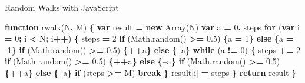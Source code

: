 \documentclass[ignorenonframetext,]{beamer}
\newenvironment{Shaded}{\begin{snugshade}}{\end{snugshade}}
\newcommand{\AttributeTok}[1]{\textcolor[rgb]{0.77,0.63,0.00}{#1}}
\newcommand{\ControlFlowTok}[1]{\textcolor[rgb]{0.13,0.29,0.53}{\textbf{#1}}}
\newcommand{\DecValTok}[1]{\textcolor[rgb]{0.00,0.00,0.81}{#1}}
\newcommand{\FloatTok}[1]{\textcolor[rgb]{0.00,0.00,0.81}{#1}}
\newcommand{\KeywordTok}[1]{\textcolor[rgb]{0.13,0.29,0.53}{\textbf{#1}}}
\newcommand{\NormalTok}[1]{#1}
\newcommand{\OperatorTok}[1]{\textcolor[rgb]{0.81,0.36,0.00}{\textbf{#1}}}
\newcommand{\VariableTok}[1]{\textcolor[rgb]{0.00,0.00,0.00}{#1}}
\begin{document}
\begin{frame}[fragile]{Random Walks with JavaScript}
\protect\hypertarget{random-walks-with-javascript}{}

\begin{Shaded}
\begin{Highlighting}[]
\KeywordTok{function} \AttributeTok{rwalk}\NormalTok{(N}\OperatorTok{,}\NormalTok{ M) }\OperatorTok{\{}
    \KeywordTok{var}\NormalTok{ result }\OperatorTok{=} \KeywordTok{new} \AttributeTok{Array}\NormalTok{(N)}
    \KeywordTok{var}\NormalTok{ a }\OperatorTok{=} \DecValTok{0}\OperatorTok{,}\NormalTok{ steps}
    \ControlFlowTok{for}\NormalTok{ (}\KeywordTok{var}\NormalTok{ i }\OperatorTok{=} \DecValTok{0}\OperatorTok{;}\NormalTok{ i }\OperatorTok{<}\NormalTok{ N}\OperatorTok{;}\NormalTok{ i}\OperatorTok{++}\NormalTok{) }\OperatorTok{\{}
\NormalTok{        steps }\OperatorTok{=} \DecValTok{2}
        \ControlFlowTok{if}\NormalTok{ (}\VariableTok{Math}\NormalTok{.}\AttributeTok{random}\NormalTok{() }\OperatorTok{>=} \FloatTok{0.5}\NormalTok{) }\OperatorTok{\{}\NormalTok{a }\OperatorTok{=} \DecValTok{1}\OperatorTok{\}} \ControlFlowTok{else} \OperatorTok{\{}\NormalTok{a }\OperatorTok{=} \DecValTok{-1}\OperatorTok{\}}
        \ControlFlowTok{if}\NormalTok{ (}\VariableTok{Math}\NormalTok{.}\AttributeTok{random}\NormalTok{() }\OperatorTok{>=} \FloatTok{0.5}\NormalTok{) }\OperatorTok{\{++}\NormalTok{a}\OperatorTok{\}} \ControlFlowTok{else} \OperatorTok{\{--}\NormalTok{a}\OperatorTok{\}}
        \ControlFlowTok{while}\NormalTok{ (a }\OperatorTok{!=} \DecValTok{0}\NormalTok{) }\OperatorTok{\{}
\NormalTok{            steps }\OperatorTok{+=} \DecValTok{2}
            \ControlFlowTok{if}\NormalTok{ (}\VariableTok{Math}\NormalTok{.}\AttributeTok{random}\NormalTok{() }\OperatorTok{>=} \FloatTok{0.5}\NormalTok{) }\OperatorTok{\{++}\NormalTok{a}\OperatorTok{\}} \ControlFlowTok{else} \OperatorTok{\{--}\NormalTok{a}\OperatorTok{\}}
            \ControlFlowTok{if}\NormalTok{ (}\VariableTok{Math}\NormalTok{.}\AttributeTok{random}\NormalTok{() }\OperatorTok{>=} \FloatTok{0.5}\NormalTok{) }\OperatorTok{\{++}\NormalTok{a}\OperatorTok{\}} \ControlFlowTok{else} \OperatorTok{\{--}\NormalTok{a}\OperatorTok{\}}
            \ControlFlowTok{if}\NormalTok{ (steps }\OperatorTok{>=}\NormalTok{ M) }\ControlFlowTok{break}
        \OperatorTok{\}}
\NormalTok{        result[i] }\OperatorTok{=}\NormalTok{ steps}
    \OperatorTok{\}}
    \ControlFlowTok{return}\NormalTok{ result}
\OperatorTok{\}}
\end{Highlighting}
\end{Shaded}

\end{frame}
\end{document}
